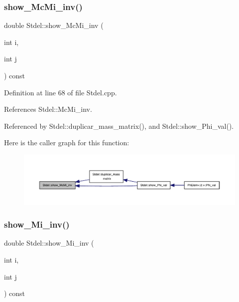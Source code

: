 \subsubsection{\texorpdfstring{show\+\_\+\+Mc\+Mi\+\_\+inv()}{show\_McMi\_inv()}}
{\footnotesize\ttfamily double Stdel\+::show\+\_\+\+Mc\+Mi\+\_\+inv (\begin{DoxyParamCaption}\item[{int}]{i,  }\item[{int}]{j }\end{DoxyParamCaption}) const\hspace{0.3cm}{\ttfamily [inherited]}}



Definition at line 68 of file Stdel.\+cpp.



References Stdel\+::\+Mc\+Mi\+\_\+inv.



Referenced by Stdel\+::duplicar\+\_\+mass\+\_\+matrix(), and Stdel\+::show\+\_\+\+Phi\+\_\+val().

Here is the caller graph for this function\+:
\nopagebreak
\begin{figure}[H]
\begin{center}
\leavevmode
\includegraphics[width=350pt]{classStdel_a44d5aa234e02fb41afd5a4e5e45fadc4_icgraph}
\end{center}
\end{figure}
\mbox{\label{classStdel_a11bf2897170ada9a9dd8f641a39585e5}} 
\subsubsection{\texorpdfstring{show\+\_\+\+Mi\+\_\+inv()}{show\_Mi\_inv()}}
{\footnotesize\ttfamily double Stdel\+::show\+\_\+\+Mi\+\_\+inv (\begin{DoxyParamCaption}\item[{int}]{i,  }\item[{int}]{j }\end{DoxyParamCaption}) const\hspace{0.3cm}{\ttfamily [inherited]}}



